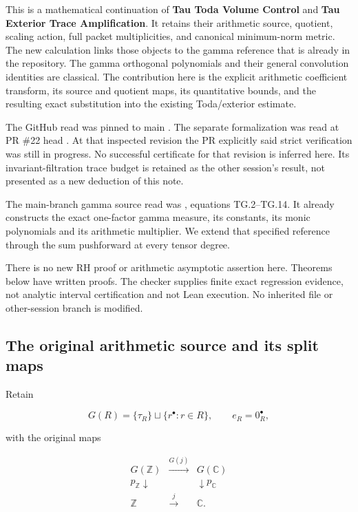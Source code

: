This is a mathematical continuation of \textbf{Tau Toda Volume Control}
and \textbf{Tau Exterior Trace Amplification}. It retains their
arithmetic source, quotient, scaling action, full packet multiplicities,
and canonical minimum-norm metric. The new calculation links those
objects to the gamma reference that is already in the repository. The
gamma orthogonal polynomials and their general convolution identities
are classical. The contribution here is the explicit arithmetic
coefficient transform, its source and quotient maps, its quantitative
bounds, and the resulting exact substitution into the existing
Toda/exterior estimate.

The GitHub read was pinned to main
. The separate
formalization was read at PR \#22 head
. At that inspected
revision the PR explicitly said strict verification was still in
progress. No successful certificate for that revision is inferred here.
Its invariant-filtration trace budget is retained as the other session's
result, not presented as a new deduction of this note.

The main-branch gamma source read was
,
equations TG.2--TG.14. It already constructs the exact one-factor gamma
measure, its constants, its monic polynomials and its arithmetic
multiplier. We extend that specified reference through the sum
pushforward at every tensor degree.

There is no new RH proof or arithmetic asymptotic assertion here.
Theorems below have written proofs. The checker supplies finite exact
regression evidence, not analytic interval certification and not Lean
execution. No inherited file or other-session branch is modified.

\subsection[\hspace{0.4em}The original arithmetic source and its split
maps]{The original arithmetic source and its split
maps}\label{gammad-the-original-arithmetic-source-and-its-split-maps}

Retain

\[
G(R)=\{\tau_R\}\sqcup\{r^\bullet:r\in R\},\qquad e_R=0_R^\bullet,
\]

with the original maps

\[
\begin{array}{ccc}
G(\mathbb Z)&\xrightarrow{G(j)}&G(\mathbb C)\\
p_{\mathbb Z}\downarrow&&\downarrow p_{\mathbb C}\\
\mathbb Z&\xrightarrow{j}&\mathbb C.
\end{array}                                                    \tag{GD.1}
\]

